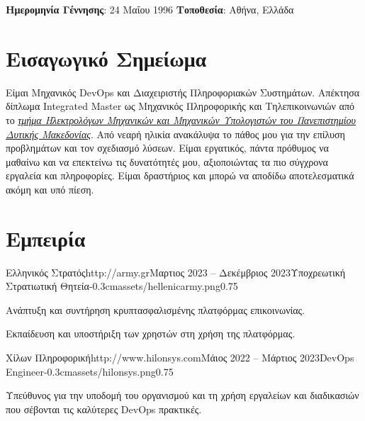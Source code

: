 \documentclass{mycv}
\begin{document}
	\pagestyle{empty}
	\centering
	{\bf Ημερομηνία Γέννησης}: 24 Μαΐου 1996 {\Large\textperiodcentered} {\bf Τοποθεσία}: Αθήνα, Ελλάδα

	\section{Εισαγωγικό Σημείωμα}
	\textnormal Είμαι Μηχανικός DevOps και Διαχειριστής Πληροφοριακών Συστημάτων. Απέκτησα δίπλωμα Integrated Master ως Μηχανικός Πληροφορικής και Τηλεπικοινωνιών από το \href{https://ece.uowm.gr/?lan=gr}{\textit{τμήμα Ηλεκτρολόγων Μηχανικών και Μηχανικών Υπολογιστών του Πανεπιστημίου Δυτικής Μακεδονίας}}. Από νεαρή ηλικία ανακάλυψα το πάθος μου για την επίλυση προβλημάτων και τον σχεδιασμό λύσεων. Είμαι εργατικός, πάντα πρόθυμος να μαθαίνω και να επεκτείνω τις δυνατότητές μου, αξιοποιώντας τα πιο σύγχρονα εργαλεία και πληροφορίες. Είμαι δραστήριος και μπορώ να αποδίδω αποτελεσματικά ακόμη και υπό πίεση.

	\section{Εμπειρία}
	\begin{EntryDatedLogo}{Ελληνικός Στρατός}{http://army.gr}{Μαρτιος 2023 -- Δεκέμβριος 2023}{Υποχρεωτική Στρατιωτική Θητεία}{-0.3cm}{assets/hellenicarmy.png}{0.75}
		\vspace{-0.2cm}
		\begin{Itemize}
			\item Ανάπτυξη και συντήρηση κρυπτασφαλισμένης πλατφόρμας επικοινωνίας.
			\item Εκπαίδευση και υποστήριξη των χρηστών στη χρήση της πλατφόρμας.
		\end{Itemize}
	\end{EntryDatedLogo}

	\vspace{0.75cm}

	\begin{EntryDatedLogo}{Χίλων Πληροφορική}{http://www.hilonsys.com}{Μάιος 2022 -- Μάρτιος 2023}{DevOps Engineer}{-0.3cm}{assets/hilonsys.png}{0.75}
		\vspace{-0.2cm}
		\begin{Itemize}
			\item Υπεύθυνος για την υποδομή του οργανισμού και τη χρήση εργαλείων και διαδικασιών που σέβονται τις καλύτερες DevOps πρακτικές.
		\end{Itemize}
	\end{EntryDatedLogo}
\end{document}
